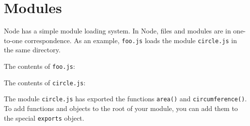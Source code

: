 \section{Modules}\label{modules}

\begin{Shaded}
\begin{Highlighting}[]
 
\end{Highlighting}
\end{Shaded}

Node has a simple module loading system. In Node, files and modules are
in one-to-one correspondence. As an example, \texttt{foo.js} loads the
module \texttt{circle.js} in the same directory.

The contents of \texttt{foo.js}:

\begin{Shaded}
\begin{Highlighting}[]
 \NormalTok{(}\NormalTok{);}
\NormalTok{( }
           \NormalTok{+ }\NormalTok{(}\NormalTok{));}
\end{Highlighting}
\end{Shaded}

The contents of \texttt{circle.js}:

\begin{Shaded}
\begin{Highlighting}[]
 \NormalTok{;}

 \NormalTok{= } 
   
\NormalTok{\};}

 \NormalTok{= } 
    
\NormalTok{\};}
\end{Highlighting}
\end{Shaded}

The module \texttt{circle.js} has exported the functions \texttt{area()}
and \texttt{circumference()}. To add functions and objects to the root
of your module, you can add them to the special \texttt{exports} object.

